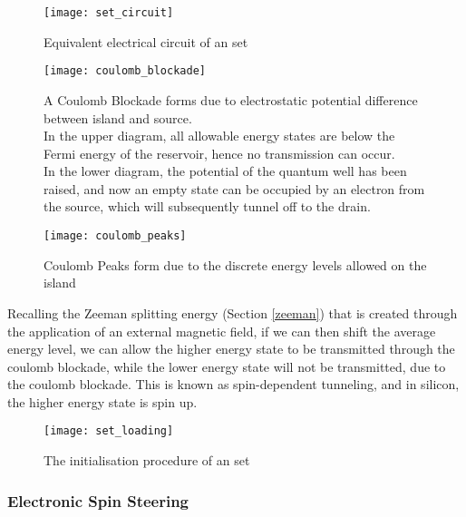 \begin{figure}[htbp!]
	\centering
	\texttt{[image: set\_circuit]}
	\caption{Equivalent electrical circuit of an \gls{set}}
	\label{fig::set_circuit}
\end{figure}

\begin{figure}[htbp!]
	\centering
	\texttt{[image: coulomb\_blockade]}
	\caption{A Coulomb Blockade \cite{coulomb_blockade} forms due to electrostatic potential difference between island and source.\\ In the upper diagram, all allowable energy states are below the Fermi energy of the reservoir, hence no transmission can occur.\\ In the lower diagram, the potential of the quantum well has been raised, and now an empty state can be occupied by an electron from the source, which will subsequently tunnel off to the drain.}
	\label{fig::coulomb_blockade}
\end{figure}

\begin{figure}[htbp!]
	\centering
	\texttt{[image: coulomb\_peaks]}
	\caption{Coulomb Peaks form due to the discrete energy levels allowed on the island}
	\label{fig::coulomb_peaks}
\end{figure}



Recalling the Zeeman splitting energy (Section \ref{zeeman}) that is created through the application of an external magnetic field, if we can then shift the average energy level, we can allow the higher energy state to be transmitted through the coulomb blockade, while the lower energy state will not be transmitted, due to the coulomb blockade. This is known as spin-dependent tunneling, and in silicon, the higher energy state is spin up.

\begin{figure}[htbp!]
	\centering
	\texttt{[image: set\_loading]}
	\caption{The initialisation procedure of an \gls{set}}
	\label{fig::set_loading}
\end{figure}


\subsubsection{Electronic Spin Steering}

